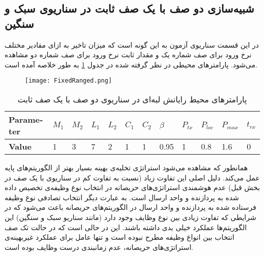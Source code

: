 \subsection{شبیه‌سازی دو صف با یک صف ثابت در سناریوی سبک و سنگین}
در این قسمت سناریوی آزمون به این گونه است که میزان تاخیر به ازای مقادیر مختلف نرخ ورود برای صف شماره یک و مقدار ثابت نرخ ورود برای صف شماره دو مشاهده می‌شود. پارامترهای محیطی در نظر گرفته شده در جدول \ref{table:fixedranged} به طور خلاصه آمده است.
\begin{figure}
	\texttt{[image: FixedRanged.png]}
\end{figure}
\begin{table}
	\centering
	\begin{latin}
		\begin{tabular}{@{}llllllllllll@{}}
			\toprule
			\textbf{Parameter} & $M_1$ & $M_2$ & $L_1$ & $L_2$ & $C_1$ & $C_2$ & $\beta$ & $P_{tx}$ & $P_{loc}$ & $P_{max}$ & $t_{rx}$ \\ \midrule
			\textbf{Value}     & 1     & 3     & 7     & 2     & 1     & 1     & 0.95    & 1        & 0.8       & 1.6       & 0        \\ \bottomrule
		\end{tabular}
	\end{latin}
	\caption{پارامترهای محیط رایانش لبه‌ای در سناریوی دو صف با یک صف ثابت}
	\label{table:fixedranged}
\end{table}
همانطور که مشاهده می‌شود استراتژی تخلیه‌ی بهینه بسیار بهتر از الگوریتم‌های پایه عمل می‌کند. دلیل اصلی این تفاوت زیاد (نسبت به تفاوت کم در سناریوی با یک صف در بخش قبل) عدم هوشمندی استراتژی‌های حریصانه در انتخاب نوع وظیفه‌ی تخصیص داده شده به پردازنده و واحد ارسال است. به عبارت دیگر انتخاب تصادفی نوع وظیفه فرستاده شده به پردازنده و واحد ارسال در الگوریتم‌های حریصانه باعث می‌شود که در شرایطی که تفاوت زیادی بین نوع وظایف وجود دارد (مانند سناریو سبک و سنگین) این الگوریتم‌ها عملکرد خیلی بدی داشته باشند. این در حالی است که در حالت تک صف انتخاب بین انواع وظیفه مطرح نبوده است و تنها عامل برای عملکرد غیربهینه‌ی استراتژی‌های حریصانه، عدم زمانبندی درست وظایف بوده است.
